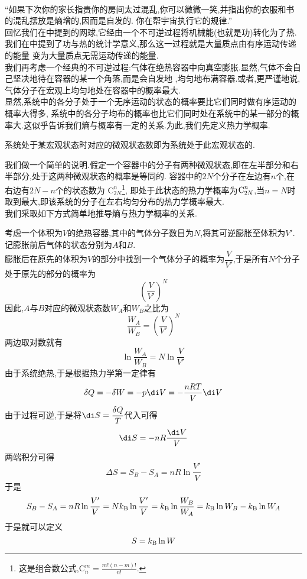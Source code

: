 \documentclass{ctexart}
\begin{document}
\pagestyle{plain}
\noindent{}\vspace{15pt}\\
\indent “如果下次你的家长指责你的房间太过混乱,你可以微微一笑,并指出你的衣服和书的混乱摆放是熵增的,因而是自发的.%
你在帮宇宙执行它的规律.”\vspace{12pt}\\
\indent 回忆我们在中提到的网球,它经由一个不可逆过程将机械能(也就是功)转化为了热.%
我们在中提到了功与热的统计学意义,那么这一过程就是大量质点由有序运动传递的能量%
变为大量质点无需运动传递的能量.\\
\indent 我们再考虑一个经典的不可逆过程:气体在绝热容器中向真空膨胀.显然,气体不会自己坚决地待在容器的某一个角落,而是会自发地%
,均匀地布满容器.或者,更严谨地说,气体分子在宏观上均匀地处在容器中的概率最大.\\
\indent 显然,系统中的各分子处于一个无序运动的状态的概率要比它们同时做有序运动的概率大得多,%
系统中的各分子均布的概率也比它们同时处在系统中的某一部分的概率大.这似乎告诉我们熵与概率有一定的关系.为此,我们先定义热力学概率.
\begin{definition}[3B.1.1 热力学概率]
    系统处于某宏观状态时对应的微观状态数即为系统处于此宏观状态的.
\end{definition}
我们做一个简单的说明.假定一个容器中的分子有两种微观状态,即在左半部分和右半部分,处于这两种微观状态的概率是等同的.%
容器中的$2N$个分子在左边有$n$个,在右边有$2N-n$个的状态数为%
$\text{C}_{2N}^{n}$\footnote{这是组合数公式,$\text{C}_n^m=\frac{m!(n-m)!}{n!}$.},%
即处于此状态的热力学概率为$\text C_{2N}^n$,当$n=N$时取到最大,即该系统的分子在左右均匀分布的热力学概率最大.\\
\indent 我们采取如下方式简单地推导熵与热力学概率的关系.
\begin{derivation}
    考虑一个体积为$V$的绝热容器,其中的气体分子数目为$N$,将其可逆膨胀至体积为$V'$.\\
    记膨胀前后气体的状态分别为$A$和$B$.\\
    膨胀后在原先的体积为$V$的部分中找到一个气体分子的概率为$\dfrac{V}{V'}$,于是所有$N$个分子处于原先的部分的概率为
    \[\left(\dfrac{V}{V'}\right)^{N}\]
    因此,$A$与$B$对应的微观状态数$W_A$和$W_B$之比为
    \[\dfrac{W_A}{W_B}=\left(\dfrac{V}{V'}\right)^{N}\]
    两边取对数就有
    \[\ln\dfrac{W_A}{W_B}=N\ln\dfrac{V}{V'}\]
    由于系统绝热,于是根据热力学第一定律有
    \[\delta Q=-\delta W=-p\di V=-\dfrac{nRT}{V}\di V\]
    由于过程可逆,于是将$\di S=\dfrac{\delta Q}{T}$代入可得
    \[\di S=-nR\dfrac{\di V}{V}\]
    两端积分可得
    \[\Delta S=S_B-S_A=nR\ln\dfrac{V'}{V}\]
    于是
    \[S_B-S_A=nR\ln\dfrac{V'}{V}=Nk_\text B\ln\dfrac{V'}{V}=k_\text B\ln\dfrac{W_B}{W_A}=k_\text B\ln W_B-k_\text B\ln W_A\]
    于是就可以定义
    \[S=k_\text B\ln W\]

\end{derivation}
\end{document}
